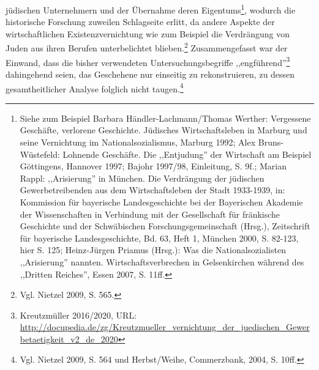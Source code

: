 jüdischen Unternehmern und der Übernahme deren Eigentums\footnote{Siehe zum Beispiel Barbara Händler-Lachmann/Thomas Werther: Vergessene Geschäfte, verlorene Geschichte. Jüdisches Wirtschaftsleben in Marburg und seine Vernichtung im Nationalsozialismus, Marburg 1992; Alex Bruns-Wüstefeld: Lohnende Geschäfte. Die ,,Entjudung'' der Wirtschaft am Beispiel Göttingens, Hannover 1997; Bajohr 1997/98, Einleitung, S. 9f.; Marian Rappl: ,,Arisierung'' in München. Die Verdrängung der jüdischen Gewerbetreibenden aus dem Wirtschaftsleben der Stadt 1933-1939, in: Kommission für bayerische Landesgeschichte bei der Bayerischen Akademie der Wissenschaften in Verbindung mit der Gesellschaft für fränkische Geschichte und der Schwäbischen Forschungsgemeinschaft (Hrsg.), Zeitschrift für bayerische Landesgeschichte, Bd. 63, Heft 1, München 2000, S. 82-123, hier S. 125; Heinz-Jürgen Priamus (Hrsg.): Was die Nationalsozialisten ,,Arisierung'' nannten. Wirtschaftsverbrechen in Gelsenkirchen während des ,,Dritten Reiches'', Essen 2007, S. 11ff.}, wodurch die historische Forschung zuweilen Schlagseite erlitt, da andere Aspekte der wirtschaftlichen Existenzvernichtung wie zum Beispiel die Verdrängung von Juden aus ihren Berufen unterbelichtet blieben.\footnote{Vgl. Nietzel 2009, S. 565.} Zusammengefasst war der Einwand, dass die bisher verwendeten Untersuchungsbegriffe ,,engführend''\footnote{Kreutzmüller 2016/2020,  URL: \url{http://docupedia.de/zg/Kreutzmueller_vernichtung_der_juedischen_Gewerbetaetigkeit_v2_de_2020}} dahingehend seien, das Geschehene nur einseitig zu rekonstruieren, zu dessen gesamtheitlicher Analyse folglich nicht taugen.\footnote{Vgl. Nietzel 2009, S. 564 und Herbst/Weihe, Commerzbank, 2004, S. 10ff.}

